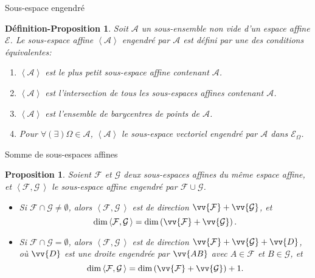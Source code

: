 \documentclass[aspectratio=1610 %
]{beamer}
\newtheorem{defprop}[theorem]{Définition-Proposition}
\newtheorem{proposition}[theorem]{Proposition}
\let\ens\mathcal
\begin{document}
  \begin{frame}{Sous-espace engendré}
    \begin{defprop}
      Soit $\mathcal{A}$ un sous-ensemble non vide d'un espace affine $\ens{E}$. Le sous-espace affine $\left<\mathcal{A}\right>$ engendré par $\mathcal{A}$ est défini par une des conditions équivalentes:
        \begin{enumerate}[<+(1)->]
          \item $\left<\mathcal{A}\right>$ est le plus petit sous-espace affine contenant $\mathcal{A}$.
          \item $\left<\mathcal{A}\right>$ est l'intersection de tous les sous-espaces affines contenant $\mathcal{A}$.
          \item $\left<\mathcal{A}\right>$ est l'ensemble de barycentres de points de $\mathcal{A}$.
          \item Pour $\forall(\exists) \Omega \in \mathcal{A}$, $\left<\mathcal{A}\right>$ le sous-espace vectoriel engendré par $\mathcal{A}$ dans $\ens{E}_{\Omega}$.
        \end{enumerate}
    \end{defprop}
  \end{frame}
  \begin{frame}{Somme de sous-espaces affines}
    \begin{proposition}
      Soient $\ens{F}$ et $\ens{G}$ deux sous-espaces affines du même espace affine, et $\left<\ens{F},\ens{G}\,\right>$ le sous-espace affine engendré par $\ens{F} \cup \ens{G}$.
      \begin{itemize}[<+(1)->]
        \item Si $\ens{F} \cap \ens{G} \neq \emptyset$, alors $\left<\ens{F},\ens{G}\,\right>$ est de direction $\vv{\ens{F}}+\vv{\ens{G}}$\pause, et
            $$
              \dim\left<\ens{F},\ens{G}\,\right> = \dim \left(\vv{\ens{F}}+\vv{\ens{G}}\right).
            $$
        \item Si $\ens{F} \cap \ens{G} = \emptyset$, alors $\left<\ens{F},\ens{G}\,\right>$ est de direction $\vv{\ens{F}}+\vv{\ens{G}}+\vv{D}$, où $\vv{D}$ est une droite engendrée par $\vv{AB}$ avec $A \in \ens{F}$ et $B \in \ens{G}$\pause, et
            $$
              \dim\left<\ens{F},\ens{G}\,\right> = \dim \left(\vv{\ens{F}}+\vv{\ens{G}}\right)+1.
            $$
      \end{itemize}
    \end{proposition}
  \end{frame}
\end{document}
